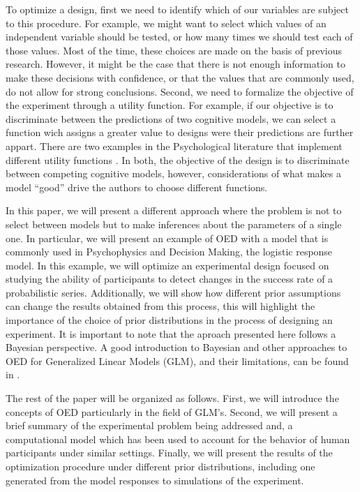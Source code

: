 \documentclass[preprint,review,12pt]{elsarticle}
\begin{document}
To optimize a design, first we need to identify which of our variables are subject to this procedure. For example, we might want to select which values of an independent variable should be tested, or how many times we should test each of those values. Most of the time, these choices are made on the basis of previous research. However, it might be the case that there is not enough information to make these decisions with confidence, or that the values that are commonly used, do not allow for strong conclusions. Second, we need to formalize the objective of the experiment through a utility function. For example, if our objective is to discriminate between the predictions of two cognitive models, we can select a function wich assigns a greater value to designs were their predictions are further appart. There are two examples in the Psychological literature that implement different utility functions \citep[e.g.][]{Myung2009,ZL2010}. In both, the objective of the design is to discriminate between competing cognitive models, however, considerations of what makes a model ``good'' drive the authors to choose different functions.

In this paper, we will present a different approach where the problem is not to select between models but to make inferences about the parameters of a single one. In particular, we will present an example of OED with a model that is commonly used in Psychophysics and Decision Making, the logistic response model. %
In this example, we will optimize an experimental design focused on studying the ability of participants to detect changes in the success rate of a probabilistic series. Additionally, we will show how different prior assumptions can change the results obtained from this process, this will highlight the importance of the choice of prior distributions in the process of designing an experiment. It is important to note that the aproach presented here follows a Bayesian perspective. A good introduction to Bayesian and other approaches to OED for Generalized Linear Models (GLM), and their limitations, can be found in \citet{khurietal2006}.

The rest of the paper will be organized as follows. First, we will introduce the concepts of OED particularly in the field of GLM's. Second, we will present a brief summary of the experimental problem being addressed and, a computational model which has been used to account for the behavior of human participants under similar settings. Finally, we will present the results of the optimization procedure under different prior distributions, including one generated from the model responses to simulations of the experiment.
\end{document}
